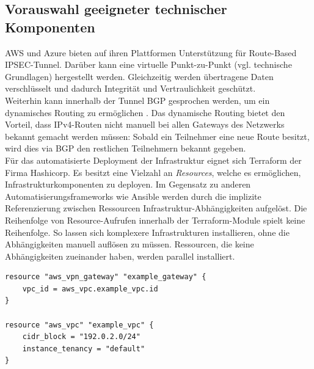 \subsection{Vorauswahl geeigneter technischer Komponenten}
AWS und Azure bieten auf ihren Plattformen Unterstützung für Route-Based IPSEC-Tunnel. Darüber kann eine virtuelle Punkt-zu-Punkt (vgl. technische Grundlagen) hergestellt werden. Gleichzeitig werden übertragene Daten verschlüsselt und dadurch Integrität und Vertraulichkeit geschützt.\\
Weiterhin kann innerhalb der Tunnel BGP gesprochen werden, um ein dynamisches Routing zu ermöglichen \cite[S. 19]{AlShawi2020} \cite[S. 74-79]{Toroman2019}. Das dynamische Routing bietet den Vorteil, dass IPv4-Routen nicht manuell bei allen Gateways des Netzwerks bekannt gemacht werden müssen: Sobald ein Teilnehmer eine neue Route besitzt, wird dies via BGP den restlichen Teilnehmern bekannt gegeben.\\
Für das automatisierte Deployment der Infrastruktur eignet sich Terraform der Firma Hashicorp. Es besitzt eine Vielzahl an \textit{Resources}, welche es ermöglichen, Infrastrukturkomponenten  zu deployen. Im Gegensatz zu anderen Automatisierungsframeworks wie Ansible werden durch die implizite Referenzierung zwischen Ressourcen Infrastruktur-Abhängigkeiten aufgelöst.
Die Reihenfolge von Resource-Aufrufen innerhalb der Terraform-Module spielt keine Reihenfolge. So lassen sich komplexere Infrastrukturen installieren, ohne die Abhängigkeiten manuell auflösen zu müssen. Ressourcen, die keine Abhängigkeiten zueinander haben, werden parallel installiert.

\begin{lstlisting}[label=terraform-implicit-dependeny,caption=Durch die implizite Referenz auf \textit{aws\_vpc.example\_vpc.id} wird zuerst die Ressource \textit{example\_vpc} ausgeführt]
resource "aws_vpn_gateway" "example_gateway" {
	vpc_id = aws_vpc.example_vpc.id
}

resource "aws_vpc" "example_vpc" {
	cidr_block = "192.0.2.0/24"
	instance_tenancy = "default"
}
\end{lstlisting}


